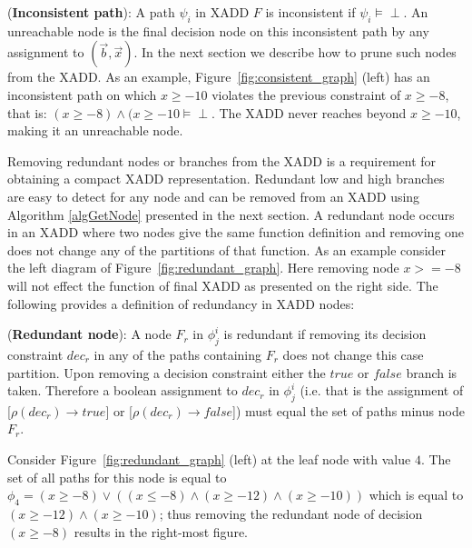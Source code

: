 \documentclass[twoside,11pt]{article}
\newenvironment{mydef}[1][Definition]{\begin{trivlist}
\item[\hskip \labelsep {\bfseries #1}]}{\end{trivlist}}
\begin{document}
\begin{mydef}(\textbf{Inconsistent path}):
A path $\psi_i$ in XADD $F$ is inconsistent if $\psi_i \models \perp$.
An unreachable node is the final decision node on this inconsistent path by any assignment to $(\vec{b},\vec{x})$. In the next section we describe how to prune such nodes from the XADD.
As an example, Figure~\ref{fig:consistent_graph} (left) has an inconsistent path on which $x \geq -10$ violates the previous constraint of $x\geq -8$, that is: $(x \geq -8) \wedge (x \geq -10 \models\perp$. The XADD never reaches beyond $x \geq -10$, making it an unreachable node.
\end{mydef}

Removing redundant nodes or branches from the XADD is a requirement for obtaining a compact XADD representation. Redundant low and high branches are easy to detect for any node and can be removed from an XADD using Algorithm \ref{algGetNode} presented in the next section. A redundant node occurs in an XADD where two nodes give the same function definition and removing one does not change any of the partitions of that function. As an example consider the left diagram of Figure~\ref{fig:redundant_graph}. Here removing node $x>=-8$ will not effect the function of final XADD as presented on the right side. The following provides a definition of redundancy in XADD nodes:  
\begin{mydef}(\textbf{Redundant node}):
A node $F_r$ in $\phi_j^i$ is redundant if removing its decision constraint $\mathit{dec}_r$ in any of the paths containing $F_r$ does not change this case partition. Upon removing a decision constraint either the $\mathit{true}$ or $\mathit{false}$ branch is taken. Therefore a boolean assignment to $\mathit{dec}_r$ in $\phi_j^i$ (i.e. that is the assignment of [$\rho(\mathit{dec}_r) \rightarrow \mathit{true}$] or [$\rho(\mathit{dec}_r) \rightarrow \mathit{false}$])
must equal the set of paths minus node $F_r$. 

Consider Figure~\ref{fig:redundant_graph} (left) at the leaf node with value $4$. The set of all paths for this node is equal to $\phi_4 = (x \geq -8) \vee ((x \leq -8)\wedge(x \geq -12)\wedge(x \geq -10))$ which is equal to $(x \geq -12)\wedge(x \geq -10)$; thus removing the redundant node of decision $(x \geq -8)$ results in the right-most figure.
\end{mydef}
\end{document}

